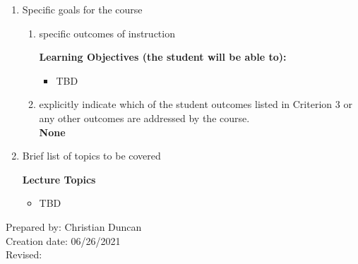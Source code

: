 \begin{enumerate}[1.]
\begin{enumerate}[a.]
\end{enumerate}

\item Specific goals for the course
\begin{enumerate}
\item specific outcomes of instruction\\ %
  {\bfseries
    Learning Objectives (the student will be able to):
    \begin{itemize}
      \item TBD
    \end{itemize}
  }

\item explicitly indicate which of the student outcomes listed in Criterion 3 or any other outcomes are addressed by the course.\\
  {\bfseries
    None
  }
\end{enumerate}

\item Brief list of topics to be covered\\
  {\bfseries
    Lecture Topics
    \begin{itemize}
      \item TBD
    \end{itemize}
  }

\end{enumerate}

\noindent Prepared by: Christian Duncan\\
\noindent Creation date: 06/26/2021\\
\noindent Revised:\\
